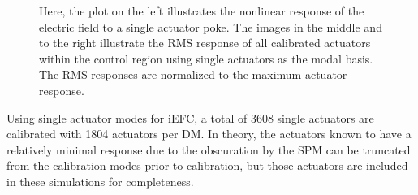 \documentclass[12pt]{spieman}  %
\begin{document}
\begin{spacing}{2}
\begin{figure}[h]
    \centering
    \caption{Here, the plot on the left illustrates the nonlinear response of the electric field to a single actuator poke. The images in the middle and to the right illustrate the RMS response of all calibrated actuators within the control region using single actuators as the modal basis. The RMS responses are normalized to the maximum actuator response.}
    \label{fig:poke-dm-response}
\end{figure}

Using single actuator modes for iEFC, a total of 3608 single actuators are calibrated with 1804 actuators per DM. In theory, the actuators known to have a relatively minimal response due to the obscuration by the SPM can be truncated from the calibration modes prior to calibration, but those actuators are included in these simulations for completeness.


\end{spacing}
\end{document}
